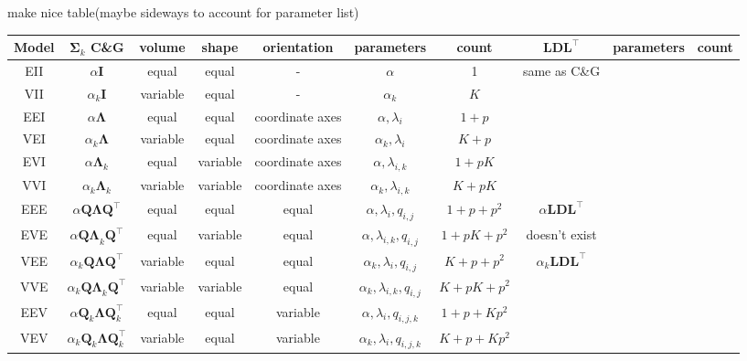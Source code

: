 make nice table(maybe sideways to account for parameter list)


\begin{table}[!htb]
    \centering
{}
{
    \begin{tabular}{| c | c c c c c c | c c c |}
        \hline
        Model & $\pmb{\Sigma}_k$ C\&G & volume & shape & orientation & parameters & count & $ \pmb{LDL}^\top $ & parameters & count \\
        \hline

        EII    & $ \alpha \pmb{I} $ & equal & equal & - & $ \alpha $ & 1 & same as C\&G & & \\
        VII    & $ \alpha_k \pmb{I} $         & variable & equal & - & $ \alpha_k $ & $ K $ & & & \\
        EEI    & $ \alpha \pmb{\Lambda} $     & equal & equal & coordinate axes & $ \alpha, \lambda_i $ & $ 1+p $ & & & \\
        VEI    & $ \alpha_k \pmb{\Lambda} $ & variable & equal & coordinate axes & $ \alpha_k, \lambda_{i}$ & $ K+p $ & & & \\
        EVI    & $ \alpha \pmb{\Lambda}_k $ &equal & variable & coordinate axes & $ \alpha, \lambda_{i,k} $ & $ 1+pK $ & & & \\
        VVI    & $ \alpha_k \pmb{\Lambda}_k $ & variable & variable & coordinate axes & $ \alpha_k, \lambda_{i,k} $ & $ K+pK $ & & & \\
        \hline
        EEE    & $ \alpha \pmb{Q \Lambda Q}^\top $ &equal & equal & equal & $ \alpha, \lambda_{i}, q_{i,j} $ & $ 1+p+p^2 $ & $ \alpha \pmb{LDL}^{\top} $ & & \\
        \hline
        EVE    & $ \alpha \pmb{Q \Lambda}_k \pmb{Q}^\top $ &equal & variable & equal & $ \alpha, \lambda_{i,k}, q_{i,j} $ & $ 1+pK+p^2 $ & doesn't exist & & \\
        \hline
        VEE    & $ \alpha_k \pmb{Q \Lambda Q}^\top $ & variable & equal & equal & $ \alpha_k, \lambda_{i}, q_{i,j} $ & $ K+p+p^2 $ & $ \alpha_k \pmb{LDL}^\top $ & & \\
        \hline
        VVE    & $ \alpha_k \pmb{Q \Lambda}_k \pmb{Q}^\top $ &variable & variable & equal & $ \alpha_k, \lambda_{i,k}, q_{i,j} $ & $ K+pK+p^2 $ & & & \\
        EEV    & $ \alpha \pmb{Q}_k \pmb{\Lambda} \pmb{Q}_k^\top $ &equal & equal & variable & $ \alpha, \lambda_{i}, q_{i,j,k} $ & $ 1+p+Kp^2 $ &    & & \\
        VEV    & $ \alpha_k \pmb{Q}_k \pmb{\Lambda} \pmb{Q}_k^\top $ &variable & equal & variable & $ \alpha_k, \lambda_{i}, q_{i,j,k} $ & $ K+p+Kp^2 $ & & & \\

\end{tabular}}
\end{table}
